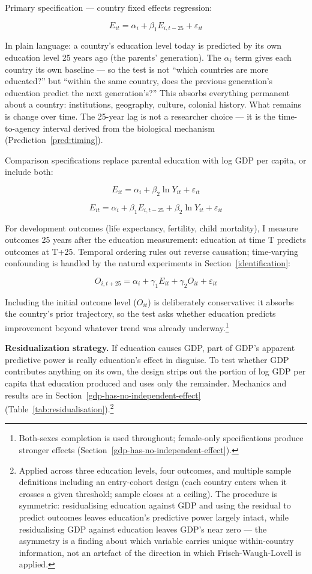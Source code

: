 \documentclass[12pt,letterpaper]{article}
\begin{document}
Primary specification --- country fixed effects regression:

\[E_{it} = \alpha_i + \beta_1 E_{i,t-25} + \varepsilon_{it}\]

In plain language: a country's education level today is predicted by its own education level 25 years ago (the parents' generation). The $\alpha_i$ term gives each country its own baseline --- so the test is not ``which countries are more educated?'' but ``within the same country, does the previous generation's education predict the next generation's?'' This absorbs everything permanent about a country: institutions, geography, culture, colonial history. What remains is change over time. The 25-year lag is not a researcher choice --- it is the time-to-agency interval derived from the biological mechanism (Prediction~\ref{pred:timing}).

Comparison specifications replace parental education with log GDP per capita, or include both:

\[E_{it} = \alpha_i + \beta_2 \ln Y_{it} + \varepsilon_{it}\]

\[E_{it} = \alpha_i + \beta_1 E_{i,t-25} + \beta_2 \ln Y_{it} + \varepsilon_{it}\]

For development outcomes (life expectancy, fertility, child mortality), I measure outcomes 25 years after the education measurement: education at time T predicts outcomes at T+25. Temporal ordering rules out reverse causation; time-varying confounding is handled by the natural experiments in Section~\ref{identification}:

\[O_{i,t+25} = \alpha_i + \gamma_1 E_{it} + \gamma_2 O_{it} + \varepsilon_{it}\]

Including the initial outcome level ($O_{it}$) is deliberately conservative: it absorbs the country's prior trajectory, so the test asks whether education predicts improvement beyond whatever trend was already underway.\footnote{Both-sexes completion is used throughout; female-only specifications produce stronger effects (Section~\ref{gdp-has-no-independent-effect}).}

\textbf{Residualization strategy.} If education causes GDP, part of
GDP's apparent predictive power is really education's effect in
disguise. To test whether GDP contributes anything on its own, the
design strips out the portion of log GDP per capita that education produced and
uses only the remainder. Mechanics and results are in
Section~\ref{gdp-has-no-independent-effect} (Table~\ref{tab:residualisation}).\footnote{Applied across three education levels, four outcomes, and multiple sample definitions including an entry-cohort design (each country enters when it crosses a given threshold; sample closes at a ceiling). The procedure is symmetric: residualising education against GDP and using the residual to predict outcomes leaves education's predictive power largely intact, while residualising GDP against education leaves GDP's near zero --- the asymmetry is a finding about which variable carries unique within-country information, not an artefact of the direction in which Frisch-Waugh-Lovell is applied.}
\end{document}
